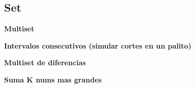 \subsection{Set}
    \textbf{Multiset}
    

    \textbf{Intervalos consecutivos (simular cortes en un palito)}
    

    \textbf{Multiset de diferencias}
    

    \textbf{Suma K nums mas grandes}
    
